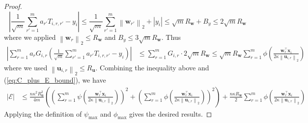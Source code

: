 \documentclass[10pt]{article} %
\theoremstyle{definition}
\theoremstyle{plain}
\newcommand{\paren}[1]{\left(#1\right)}
\newcommand{\norm}[1]{\left\|#1\right\|}
\def\bfu{{\mathbf{u}}}\def\bfv{{\mathbf{v}}}\def\bfw{{\mathbf{w}}}\def\bfx{{\mathbf{x}}}
\begin{document}
\begin{proof}
    \[
        \left|\frac{1}{\sqrt{m}}\sum_{r'=1}^ma_{r'}T_{i,r,r'} - y_i\right| \leq \frac{1}{\sqrt{m}}\sum_{r'=1}^m\norm{\bfw_{r'}}_2 + \left|y_i\right| \leq \sqrt{m}R_{\bfw} + B_y \leq 2\sqrt{m}R_{\bfw}
    \]
    where we applied $\norm{\bfw_r}_2\leq R_{\bfw}$ and $B_y\leq 3\sqrt{m} R_{\bfw}$. Thus
    \begin{align*}
        \left|\sum_{r=1}^ma_rG_{i,r}\paren{\frac{1}{\sqrt{m}}\sum_{r'=1}^ma_{r'}T_{i,r,r'} - y_i}\right| & \leq \sum_{r=1}^mG_{i,r}\cdot 2\sqrt{m}R_{\bfw} \leq \sqrt{m}R_{\bfw}\sum_{r=1}^m\phi\paren{\frac{\bfw_r^\top\bfx_i}{2\kappa\norm{\bfu_{i,r}}_2}}
    \end{align*}
    where we used $\norm{\bfu_{i,r}}_2\leq R_{\bfu}$.
    Combining the inequality above and (\ref{eq:C_plus_E_bound}), we have
    \begin{align*}
        \left|\mathcal{E}\right| & \leq \frac{n\kappa^2R_{\bfu}^2}{4m}\paren{\paren{\sum_{r=1}^m\psi\paren{\frac{\bfw_r^\top\bfx_i}{2\kappa\norm{\bfu_{i,r}}_2}}}^2 + \paren{\sum_{r=1}^m\phi\paren{\frac{\bfw_r^\top\bfx_i}{2\kappa\norm{\bfu_{i,r}}_2}}}^2} + \frac{n\kappa R_{\bfw}}{2}\sum_{r=1}^m\phi\paren{\frac{\bfw_r^\top\bfx_i}{2\kappa\norm{\bfu_{i,r}}_2}}
    \end{align*}
    Applying the definition of $\psi_{\max}$ and $\phi_{\max}$ gives the desired results.
\end{proof}
\end{document}
